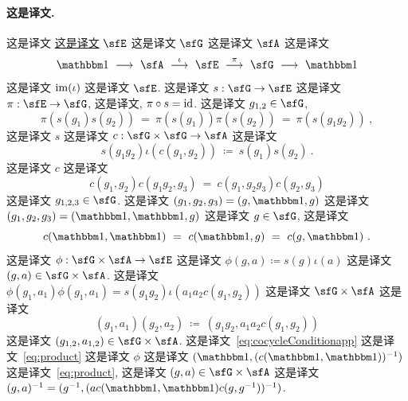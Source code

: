 \documentclass[
    affil-it, %
    auth-lg, %
    british, %
    compression, %
    contents, %
    custom-packages={}, %
    references={bigone}, %
]{lib/preprint}
\begin{document}
\begin{body}
        \paragraph{这是译文.}
 这是译文 \uline{这是译文} $\sfE$ 这是译文 $\sfG$ 这是译文 $\sfA$ 这是译文         \begin{equation}\label{eq:centralExtension}
            \unit\ \longrightarrow\ \sfA\ \overset{\iota}{\longrightarrow}\ \sfE\ \overset{\pi}{\longrightarrow}\ \sfG\ \longrightarrow\ \unit
        \end{equation}  这是译文 $\mathrm{im}(\iota)$ 这是译文 $\sfE$. 这是译文 $s:\sfG\rightarrow\sfE$ 这是译文 $\pi:\sfE\rightarrow\sfG$, 这是译文, $\pi\circ s=\mathrm{id}$. 这是译文 $g_{1,2}\in\sfG$,         \begin{equation}
            \pi(s(g_1)s(g_2))\ =\ \pi(s(g_1))\pi(s(g_2))\ =\ \pi(s(g_1g_2))~,
        \end{equation}  这是译文 $s$ 这是译文 $c:\sfG\times\sfG\rightarrow\sfA$ 这是译文         \begin{equation}\label{eq:cocycle}
            s(g_1g_2)\iota(c(g_1,g_2))\ \coloneqq\ s(g_1)s(g_2)~.
        \end{equation}  这是译文 $c$ 这是译文         \begin{equation}\label{eq:cocycleConditionapp}
            c(g_1,g_2)c(g_1g_2,g_3)\ =\ c(g_1,g_2g_3)c(g_2,g_3)
        \end{equation}  这是译文 $g_{1,2,3}\in\sfG$. 这是译文 $(g_1,g_2,g_3)=(g,\unit,g)$ 这是译文 $(g_1,g_2,g_3)=(\unit,\unit,g)$ 这是译文 $g\in\sfG$, 这是译文         \begin{equation}\label{eq:normalisation1}
            c(\unit,\unit)\ =\ c(\unit,g)\ =\ c(g,\unit)~.
        \end{equation}  这是译文 $\phi:\sfG\times\sfA\to\sfE$ 这是译文 $\phi(g,a)\coloneqq s(g)\iota(a)$ 这是译文 $(g,a)\in\sfG\times\sfA$. 这是译文 $\phi(g_1,a_1)\phi(g_1,a_1)=s(g_1g_2)\iota(a_1a_2c(g_1,g_2))$ 这是译文 $\sfG\times\sfA$ 这是译文         \begin{equation}\label{eq:product}
            (g_1,a_1)(g_2,a_2)\ \coloneqq\ (g_1g_2,a_1a_2c(g_1,g_2))
        \end{equation}  这是译文 $(g_{1,2},a_{1,2})\in\sfG\times\sfA$. 这是译文~\eqref{eq:cocycleConditionapp} 这是译文~\eqref{eq:product} 这是译文 $\phi$ 这是译文 $(\unit,(c(\unit,\unit))^{-1})$ 这是译文~\eqref{eq:product}, 这是译文 $(g,a)\in\sfG\times\sfA$ 这是译文 $(g,a)^{-1}=(g^{-1},(ac(\unit,\unit)c(g,g^{-1}))^{-1})$.
        

\end{body}
\end{document}
